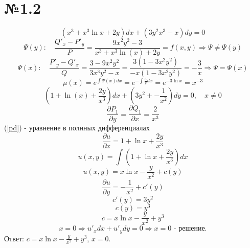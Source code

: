 \documentclass{article}
\begin{document}
\section*{№1.2}
\begin{equation*}
    (x^3+x^3\ln{x}+2y)dx+(3y^2x^3-x)dy=0
\end{equation*}
\begin{equation*}
    \Psi(y): \quad \frac{Q'_x-P'_y}{P}=
    \frac{9x^2y^2-3}{x^3+x^3\ln(x)+2y}=f(x,y) \Rightarrow \Psi\neq\Psi(y)
\end{equation*}
\begin{equation*}
    \Psi(x): \quad \frac{P'_y-Q'_x}{Q}=
    \frac{3-9x^2y^2}{3x^3y^2-x}=
    \frac{3(1-3x^2y^2)}{-x(1-3x^2y^2)}=-\frac{3}{x}
    \Rightarrow \Psi=\Psi(x)
\end{equation*}
\begin{equation*}
    \mu(x)=e^{\int\Psi(x)dx}=e^{-\int\frac{3}{x}dx}=e^{-3\ln x}=x^{-3}
\end{equation*}
\begin{equation}
    \left(1+\ln(x)+\frac{2y}{x^3}\right)dx+\left(3y^2+-\frac{1}{x^2}\right)dy=0 \label{pd},\quad x\neq0
\end{equation}
\begin{equation*}
    \frac{\partial P_1}{\partial y}=\frac{\partial Q_1}{\partial x}=\frac{2}{x^3}
\end{equation*}
(\ref{pd}) - уравнение в полнных дифференциалах
\begin{equation*}
    \frac{\partial u}{\partial x} = 1+\ln x+\frac{2y}{x^3}
\end{equation*}
\begin{equation*}
    u(x,y)= \int \left(1+\ln x+\frac{2y}{x^3}\right)dx
\end{equation*}
\begin{equation*}
    u(x,y)= x\ln x-\frac{y}{x^2}+c(y)
\end{equation*}
\begin{equation*}
    \frac{\partial u}{\partial y} = -\frac{1}{x^2}+c'(y)
\end{equation*}
\begin{equation*}
    c'(y)=3y^2
\end{equation*}
\begin{equation*}
    c(y)=y^3
\end{equation*}
\begin{equation*}
    c=x\ln x-\frac{y}{x^2}+y^3
\end{equation*}
\begin{equation*}
    x=0 \Rightarrow  u'_xdx+u'_ydy=0 \Rightarrow x=0\text{ - решение.}  
\end{equation*}
Ответ: $c=x\ln x-\frac{y}{x^2}+y^3$, $x=0$.
\end{document}
